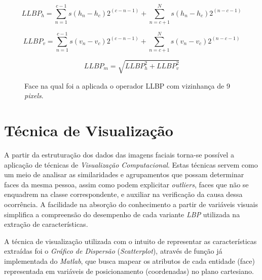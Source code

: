 \documentclass[conference]{IEEEtran}
\begin{document}
\begin{equation}
LLBP_h = \sum_{n=1}^{c-1}s(h_n - h_c)2^{(c-n-1)} 
+ \sum_{n=c+1}^{N}s(h_n - h_c)2^{(n-c-1)}
\label{eq_llbph}
\end{equation} 

\begin{equation}
LLBP_v= \sum_{n=1}^{c-1}s(v_n - v_c)2^{(c-n-1)} 
+ \sum_{n=c+1}^{N}s(v_n - v_c)2^{(n-c-1)}
\label{eq_llbpv}
\end{equation} 

\begin{equation}
LLBP_m = \sqrt{LLBP_{h}^{2} + LLBP_{v}^{2}}
\label{eq_llbpm}
\end{equation}


\begin{figure}[h]
  \begin{center}
    \leavevmode
    
    
   \caption{Face na qual foi a aplicada o operador LLBP com vizinhança de 9 \textit{pixels}.}
    \label{fig_exLLBP}
  \end{center}
\end{figure}

\section{Técnica de Visualização}
\label{sec_tecnica}

A partir da estruturação dos dados das imagens faciais torna-se possível a aplicação de técnicas de \textit{Visualização Computacional}. Estas técnicas servem como um meio de analisar as similaridades e agrupamentos que possam determinar faces da mesma pessoa, assim como podem explicitar \textit{outliers}, faces que não se enquadrem na classe correspondente, e auxiliar na verificação da causa dessa ocorrência. A facilidade na absorção do conhecimento a partir de variáveis visuais simplifica a compreensão do desempenho de cada variante \textit{LBP} utilizada na extração de características.

A técnica de visualização utilizada com o intuito de representar as características extraídas foi o \textit{Gráfico de Dispersão} (\textit{Scatterplot}), através de função já implementada do \textit{Matlab}, que busca mapear os atributos de cada entidade (face) representada em variáveis de posicionamento (coordenadas) no plano cartesiano. 
\end{document}
